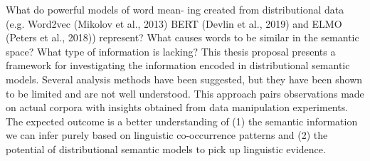 What do powerful models of word mean- ing created from distributional data (e.g. Word2vec (Mikolov et al., 2013) BERT (Devlin et al., 2019) and ELMO (Peters et al., 2018)) represent? What causes words to be similar in the semantic space? What type of information is lacking? This thesis proposal presents a framework for investigating the information encoded in distributional semantic models. Several analysis methods have been suggested, but they have been shown to be limited and are not well understood. This approach pairs observations made on actual corpora with insights obtained from data manipulation experiments. The expected outcome is a better understanding of (1) the semantic information we can infer purely based on linguistic co-occurrence patterns and (2) the potential of distributional semantic models to pick up linguistic evidence.
